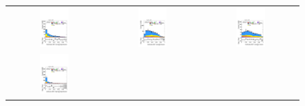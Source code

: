 \begin{figure}[htbp]
  \centering
  \setlength{\tabcolsep}{2pt}
  \renewcommand{\arraystretch}{0}
  
  \begin{tabular}{ccc}
    \includegraphics[width=0.32\textwidth]{images/sr_cr_plots/plot_tth_signal_multiclass_lt200_hh_tth_cr_Ztt.pdf} &
    \includegraphics[width=0.32\textwidth]{images/sr_cr_plots/plot_tth_ttbar_multiclass_lt200_hh_tth_cr_Ztt.pdf} &
    \includegraphics[width=0.32\textwidth]{images/sr_cr_plots/plot_tth_Z_multiclass_lt200_hh_tth_cr_Ztt.pdf} \\[4pt]
    \includegraphics[width=0.32\textwidth]{images/sr_cr_plots/plot_tth_signal_multiclass_gt200_hh_tth_cr_Ztt.pdf} &

\end{tabular}
\end{figure}
